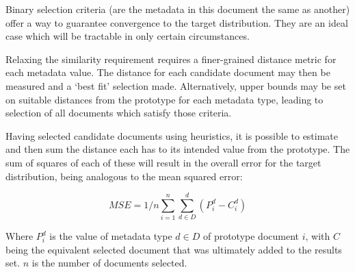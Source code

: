 Binary selection criteria (are the metadata in this document the same as another) offer a way to guarantee convergence to the target distribution.  They are an ideal case which will be tractable in only certain circumstances.

Relaxing the similarity requirement requires a finer-grained distance metric for each metadata value.  The distance for each candidate document may then be measured and a `best fit' selection made.  Alternatively, upper bounds may be set on suitable distances from the prototype for each metadata type, leading to selection of all documents which satisfy those criteria.

Having selected candidate documents using heuristics, it is possible to estimate and then sum the distance each has to its intended value from the prototype.  The sum of squares of each of these will result in the overall error for the target distribution, being analogous to the mean squared error:

$$
MSE = 1/n\sum_{i=1}^{n}\sum_{d \in D}^{d}{(P_i^d - C_i^d)}
$$ 

Where $P_i^d$ is the value of metadata type $d \in D$ of prototype document $i$, with $C$ being the equivalent selected document that was ultimately added to the results set.  $n$ is the number of documents selected.




















%
%
%
%

